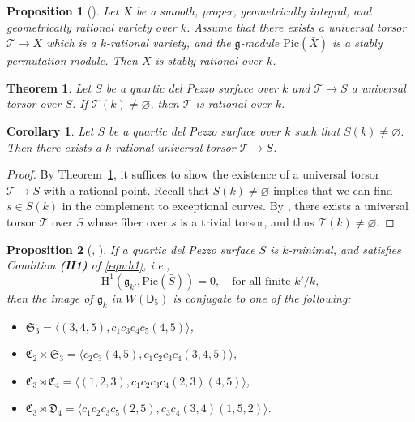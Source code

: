 \documentclass[10pt,a4paper]{amsart}
\newtheorem{prop}{Proposition}
\newtheorem{theo}{Theorem}
\newtheorem{coro}{Corollary}
\def\Pic{\mathrm{Pic}}
\def\cT{{\mathcal T}}
\def\fC{{\mathfrak C}}
\def\fD{{\mathfrak D}}
\def\fS{{\mathfrak S}}
\def\rH{{\mathrm H}}
\def\sD{{\mathsf D}}
\begin{document}
\begin{prop}[{\cite[Proposition 3]{bctspstably}}]\label{prop:bctsmain}
    Let 
$X$ be a smooth, proper, geometrically integral, and geometrically rational 
variety over $k$. Assume that 
there exists a universal torsor 
$\cT\to X$ which is a
$k$-rational variety, and the 
$\mathfrak g$-module $\Pic(\bar{X})$ is a stably permutation module. Then $X$ is stably rational over $k$.
\end{prop}

\begin{theo}\label{thm:mainrepeat}
    Let $S$ be a quartic del Pezzo surface over $k$ and $\cT\to S$ a universal torsor over $S$. If $\cT(k)\neq \varnothing$, then  $\cT$ is rational over $k$. 
\end{theo}

\begin{coro}\label{coro:rattorsor}
    Let $S$ be a quartic del Pezzo surface over $k$ such that $S(k)\ne \varnothing$. Then there exists a $k$-rational universal torsor $\cT\to S$.
\end{coro}
\begin{proof}
    By Theorem~\ref{thm:mainrepeat}, it suffices to show the existence of a universal torsor $\cT\to S$ with a rational point. Recall that $S(k)\ne \varnothing$ implies that we can find $s\in S(k)$ in the complement to exceptional curves. By \cite[Corollary 2.3.4]{CTSansucDuke}, there exists a universal torsor $\cT$ over $S$ whose fiber over $s$ is a trivial torsor, and thus $\cT(k)\ne \varnothing$.
\end{proof}

\begin{prop}[{\cite{KSS}, \cite{TY}}]\label{prop:h1}
    If a quartic del Pezzo surface $S$ is $k$-minimal, and satisfies Condition {\bf (H1)} of \eqref{eqn:h1}, i.e., 
    $$
    \rH^1(\mathfrak g_{k'},\Pic(\bar{S}))=0,\quad \text{for all finite } k'/k,
    $$
   then the image of $\mathfrak g_{k}$ in $W(\sD_5)$ is conjugate to one of the following:
   \begin{itemize}
       \item[$(I_0):$] $\fS_3=\langle (3,4,5),c_1c_3c_4c_5(4,5)\rangle$,
         \item[$(I_1):$] $\fC_2\times\fS_3=\langle c_2c_3(4,5),c_1c_2c_3c_4(3,4,5)\rangle$,
           \item[$(I_2):$] $\fC_3\rtimes\fC_4=\langle (1,2,3),c_1c_2c_3c_4(2,3)(4,5)\rangle$,
             \item[$(I_3):$] $\fC_3\rtimes\fD_4=\langle c_1c_2c_3c_5(2,5),c_3c_4(3,4)(1,5,2)\rangle$.
   \end{itemize}
   \end{prop}
\end{document}

